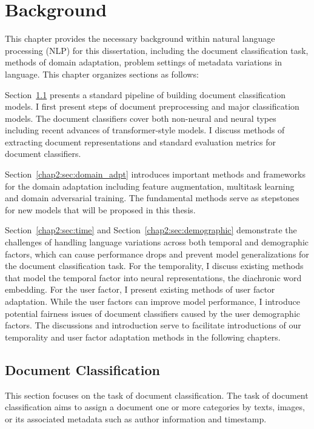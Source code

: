 \chapter{Background}
\label{chp:background}

This chapter provides the necessary background within natural language processing (NLP) for this dissertation, including the document classification task, methods of domain adaptation, problem settings of metadata variations in language.
This chapter organizes sections as follows:

Section~\ref{chap2:sec:doc_clf} presents a standard pipeline of building document classification models.
I first present steps of document preprocessing and major classification models. 
The document classifiers cover both non-neural and neural types including recent advances of transformer-style models. 
I discuss methods of extracting document representations and standard evaluation metrics for document classifiers. 

Section~\ref{chap2:sec:domain_adpt} introduces important methods and frameworks for the domain adaptation including feature augmentation, multitask learning and domain adversarial training. 
The fundamental methods serve as stepstones for new models that will be proposed in this thesis.

Section~\ref{chap2:sec:time} and Section~\ref{chap2:sec:demographic} demonstrate the challenges of handling language variations across both temporal and demographic factors, which can cause performance drops and prevent model generalizations for the document classification task.
For the temporality, I discuss existing methods that model the temporal factor into neural representations, the diachronic word embedding. 
For the user factor, I present existing methods of user factor adaptation. 
While the user factors can improve model performance, I introduce potential fairness issues of document classifiers caused by the user demographic factors.
The discussions and introduction serve to facilitate introductions of our temporality and user factor adaptation methods in the following chapters.


\section{Document Classification}
\label{chap2:sec:doc_clf}
This section focuses on the task of document classification.
The task of document classification aims to assign a document one or more categories by texts, images, or its associated metadata such as author information and timestamp.


